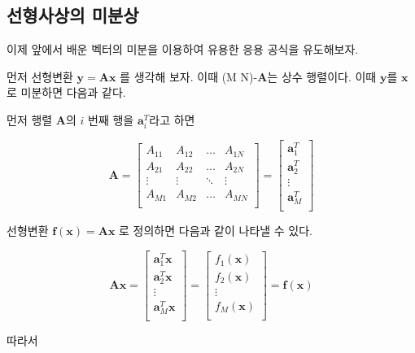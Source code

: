 \documentclass[
  11pt,
  a4paper,
  oneside]{scrbook}
\theoremstyle{definition}
\theoremstyle{definition}
\theoremstyle{plain}
\theoremstyle{remark}
\begin{document}
\subsection{선형사상의
미분상}\label{uxc120uxd615uxc0acuxc0c1uxc758-uxbbf8uxbd84uxc0c1}

이제 앞에서 배운 벡터의 미분을 이용하여 유용한 응용 공식을 유도해보자.

먼저 선형변환 \(\pmb y = \pmb A \pmb x\) 를 생각해 보자. 이때 (M
\times N)-\(\pmb A\)는 상수 행렬이다. 이때 \(\pmb y\)를 \(\pmb x\)로
미분하면 다음과 같다.

먼저 행렬 \(\pmb A\)의 \(i\) 번째 행을 \(\pmb a_i^T\)라고 하면

\[
\pmb A = \begin{bmatrix}
A_{11} & A_{12} & \dots & A_{1N} \\
A_{21} & A_{22} & \dots & A_{2N} \\
\vdots & \vdots & \ddots & \vdots \\
A_{M1} & A_{M2} & \dots & A_{MN} \\
\end{bmatrix}=
\begin{bmatrix}
\pmb a_1^T  \\
\pmb a_2^T  \\
\vdots \\
\pmb a_M^T  \\
\end{bmatrix}
\]

선형변환 \(\pmb f(\pmb x) = \pmb A \pmb x\) 로 정의하면 다음과 같이
나타낼 수 있다.

\[
\pmb A \pmb x=
\begin{bmatrix}
\pmb a_1^T \pmb x \\
\pmb a_2^T \pmb x \\
\vdots \\
\pmb a_M^T \pmb x \\
\end{bmatrix} =
\begin{bmatrix}
f_1(\pmb x) \\
f_2(\pmb x) \\
\vdots \\
f_M(\pmb x) \\
\end{bmatrix} 
= \pmb f(\pmb x) 
\]

따라서
\end{document}

